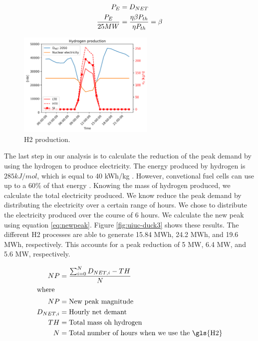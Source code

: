 \documentclass[11pt,letterpaper]{article}
\begin{document}
\begin{align}
	P_{E} &= D_{NET}  \notag \\
  \frac{P_{E}}{25 MW} &= \frac{\eta \beta P_{th}}{\eta P_{th}} = \beta  \label{eq:demand}
\end{align}


\begin{figure}[htbp!]
		\centering
	\includegraphics[height=5cm]{figures/uiuc-hydro2B}
	\hfill
	\caption{\gls{H2} production.}
	\label{fig:uiuc-duck2}
\end{figure}

The last step in our analysis is to calculate the reduction of the peak demand by using the hydrogen to produce electricity.
The energy produced by hydrogen is $285 kJ/mol$, which is equal to 40 kWh/kg \cite{ursua_hydrogen_2012}.
However, convetional fuel cells can use up to a 60$\%$ of that energy \cite{doe_energy_efficiency_and_renewable_energy_fuel_2015}.
Knowing the mass of hydrogen produced, we calculate the total electricity produced.
We know reduce the peak demand by distributing the electricity over a certain range of hours.
We chose to distribute the electricity produced over the course of 6 hours.
We calculate the new peak using equation \ref{eq:newpeak}.
Figure \ref{fig:uiuc-duck3} shows these results.
The different \gls{H2} processes are able to generate 15.84 MWh, 24.2 MWh, and 19.6 MWh, respectively.
This accounts for a peak reduction of 5 MW, 6.4 MW, and 5.6 MW, respectively.

\begin{align}
	NP &= \frac{\sum_{i=0}^{N} D_{NET, i} - TH}{N} \\
	\label{eq:newpeak}
	\intertext{where}
		NP &= \mbox{New peak magnitude} \\
		D_{NET, i} &= \mbox{Hourly net demant} \\
		TH &= \mbox{Total mass oh hydrogen} \\
		N &= \mbox{Total number of hours when we use the \gls{H2}}
\end{align}
\end{document}
